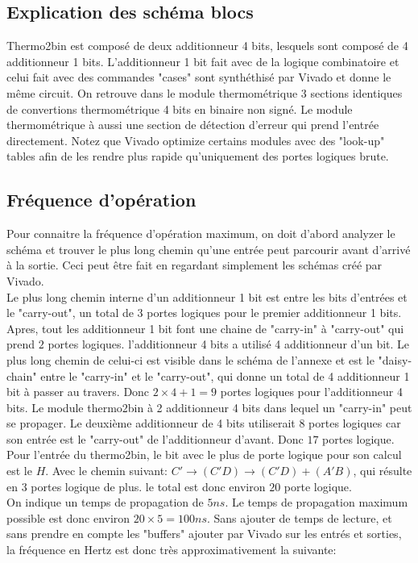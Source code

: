 \documentclass[a11paper]{article}
\begin{document}
\subsection{Explication des schéma blocs}
Thermo2bin est composé de deux additionneur 4 bits, lesquels sont composé de 4 additionneur 1 bits. L'additionneur 1 bit fait avec de la
logique combinatoire et celui fait avec des commandes "cases" sont synthéthisé par Vivado et donne le même circuit. On retrouve dans le
module thermométrique 3 sections identiques de convertions thermométrique 4 bits en binaire non signé. Le module thermométrique à aussi
une section de détection d'erreur qui prend l'entrée directement. Notez que Vivado optimize certains modules avec des "look-up" tables
afin de les rendre plus rapide qu'uniquement des portes logiques brute.

\subsection{Fréquence d'opération}
Pour connaitre la fréquence d'opération maximum, on doit d'abord analyzer le schéma et trouver le plus long chemin qu'une entrée peut
parcourir avant d'arrivé à la sortie. Ceci peut être fait en regardant simplement les schémas créé par Vivado.
\\
Le plus long chemin interne d'un additionneur 1 bit est entre les bits d'entrées et le "carry-out", un total de $3$ portes logiques pour 
le premier additionneur 1 bits. Apres, tout les additionneur 1 bit font une chaine  de "carry-in" à "carry-out" qui prend $2$ portes
logiques. l'additionneur 4 bits a utilisé 4 additionneur d'un bit. Le plus long chemin de celui-ci est visible 
dans le schéma de l'annexe et est le "daisy-chain" entre le "carry-in" et le "carry-out", qui donne un total de 4 additionneur 1 bit à 
passer au travers. Donc $2\times4+1=9$ portes logiques pour l'additionneur 4 bits. Le module thermo2bin à 2 additionneur 4 bits dans lequel 
un "carry-in" peut se propager. Le deuxième additionneur de 4 bits utiliserait $8$ portes logiques car son entrée est le 
"carry-out" de l'additionneur d'avant. Donc $17$ portes logique. Pour l'entrée du thermo2bin, le bit avec le plus de porte logique pour son 
calcul est le $H$. Avec le chemin suivant: $C'\rightarrow(C'D)\rightarrow(C'D)+(A'B)$, qui résulte en $3$ portes logique 
de plus. le total est donc environ $20$ porte logique.
\\
On indique un temps de propagation de $5ns$. Le temps de propagation maximum possible est donc environ $20\times5=100ns$. Sans ajouter de
temps de lecture, et sans prendre en compte les "buffers" ajouter par Vivado sur les entrés et sorties, la fréquence en Hertz est donc 
très approximativement la suivante:
\end{document}
